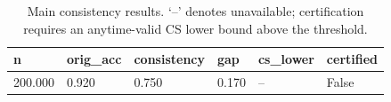 \begin{table}[t]
\centering
\begin{tabular}{llllll}
\toprule
n & orig_acc & consistency & gap & cs_lower & certified \\
\midrule
200.000 & 0.920 & 0.750 & 0.170 & -- & False \\
\bottomrule
\end{tabular}
\caption{Main consistency results. `--' denotes unavailable; certification requires an anytime-valid CS lower bound above the threshold.}
\end{table}
